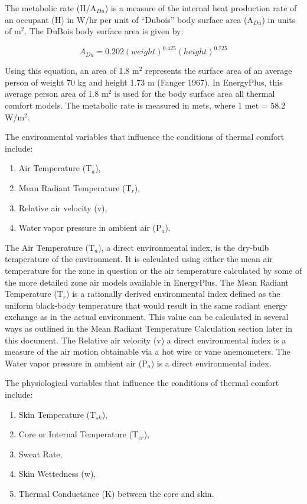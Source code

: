 The metabolic rate (H/A\(_{Du}\)) is a measure of the internal heat production rate of an occupant (H) in W/hr per unit of ``Dubois'' body surface area (A\(_{Du}\)) in units of m\(^{2}\). The DuBois body surface area is given by:

\begin{equation}
{A_{Du}} = 0.202{(weight)^{0.425}}{(height)^{0.725}}
\end{equation}

Using this equation, an area of 1.8 m\(^{2}\) represents the surface area of an average person of weight 70 kg and height 1.73 m (Fanger 1967).  In EnergyPlus, this average person area of 1.8 m\(^{2}\) is used for the body surface area all thermal comfort models.  The metabolic rate is measured in mets, where 1 met = 58.2 W/m\(^{2}\).

The environmental variables that influence the conditions of thermal comfort include:

\begin{enumerate}
\def\labelenumi{(\arabic{enumi})}
\item
  Air Temperature (T\(_{a}\)),
\item
  Mean Radiant Temperature (T\(_{r}\)),
\item
  Relative air velocity (v),
\item
  Water vapor pressure in ambient air (P\(_{a}\)).
\end{enumerate}

The Air Temperature (T\(_{a}\)), a direct environmental index, is the dry-bulb temperature of the environment. It is calculated using either the mean air temperature for the zone in question or the air temperature calculated by some of the more detailed zone air models available in EnergyPlus. The Mean Radiant Temperature (T\(_{r}\)) is a rationally derived environmental index defined as the uniform black-body temperature that would result in the same radiant energy exchange as in the actual environment. This value can be calculated in several ways as outlined in the Mean Radiant Temperature Calculation section later in this document.  The Relative air velocity (v) a direct environmental index is a measure of the air motion obtainable via a hot wire or vane anemometers. The Water vapor pressure in ambient air (P\(_{a}\)) is a direct environmental index.

The physiological variables that influence the conditions of thermal comfort include:

\begin{enumerate}
\def\labelenumi{(\arabic{enumi})}
\item
  Skin Temperature (T\(_{sk}\)),
\item
  Core or Internal Temperature (T\(_{cr}\)),
\item
  Sweat Rate,
\item
  Skin Wettedness (w),
\item
  Thermal Conductance (K) between the core and skin.
\end{enumerate}


